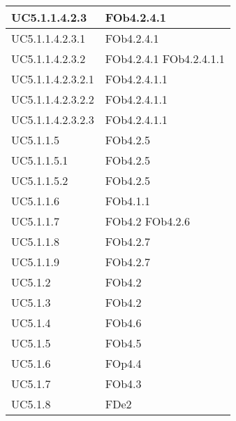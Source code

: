 \begin{longtable}{|l|l|}
\hline
		UC5.1.1.4.2.3 & FOb4.2.4.1 \linebreak   \\
\hline
		UC5.1.1.4.2.3.1 & FOb4.2.4.1 \linebreak   \\
\hline
		UC5.1.1.4.2.3.2 & FOb4.2.4.1 \linebreak  FOb4.2.4.1.1 \linebreak   \\
\hline
		UC5.1.1.4.2.3.2.1 & FOb4.2.4.1.1 \linebreak   \\
\hline
		UC5.1.1.4.2.3.2.2 & FOb4.2.4.1.1 \linebreak   \\
\hline
		UC5.1.1.4.2.3.2.3 & FOb4.2.4.1.1 \linebreak   \\
\hline
		UC5.1.1.5 & FOb4.2.5 \linebreak   \\
\hline
		UC5.1.1.5.1 & FOb4.2.5 \linebreak   \\
\hline
		UC5.1.1.5.2 & FOb4.2.5 \linebreak   \\
\hline
		UC5.1.1.6 & FOb4.1.1 \linebreak   \\
\hline
		UC5.1.1.7 & FOb4.2 \linebreak  FOb4.2.6 \linebreak   \\
\hline
		UC5.1.1.8 & FOb4.2.7 \linebreak   \\
\hline
		UC5.1.1.9 & FOb4.2.7 \linebreak   \\
\hline
		UC5.1.2 & FOb4.2 \linebreak   \\
\hline
		UC5.1.3 & FOb4.2 \linebreak   \\
\hline
		UC5.1.4 & FOb4.6 \linebreak   \\
\hline
		UC5.1.5 & FOb4.5 \linebreak   \\
\hline
		UC5.1.6 & FOp4.4 \linebreak   \\
\hline
		UC5.1.7 & FOb4.3 \linebreak   \\
\hline
		UC5.1.8 & FDe2 \linebreak   \\

\end{longtable}
